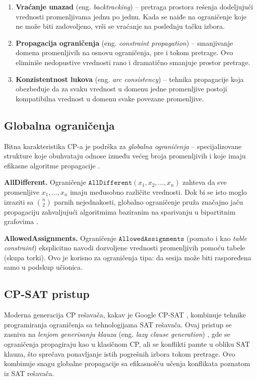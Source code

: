 \documentclass[12pt,oneside]{memoir}
\begin{document}
\begin{enumerate}
\item \textbf{Vraćanje unazad} (eng. \emph{backtracking}) --
  pretraga prostora rešenja dodeljujući vrednosti promenljivama
  jednu po jednu. Kada se naiđe na ograničenje koje ne može biti
  zadovoljeno, vrši se vraćanje na poslednju tačku izbora.

\item \textbf{Propagacija ograničenja} (eng. \emph{constraint propagation})
  -- smanjivanje domena promenljivih na osnovu ograničenja, pre i
  tokom pretrage. Ovo eliminiše nedopustive vrednosti rano i
  dramatično smanjuje prostor pretrage.

\item \textbf{Konzistentnost lukova} (eng. \emph{arc consistency}) --
  tehnika propagacije koja obezbeđuje da za svaku vrednost u domenu
  jedne promenljive postoji kompatibilna vrednost u domenu svake
  povezane promenljive.
\end{enumerate}

\subsection{Globalna ograničenja}

Bitna karakteristika CP-a je podrška za \emph{globalna ograničenja} --
specijalizovane strukture koje obuhvataju odnose između većeg broja
promenljivih i koje imaju efikasne algoritme propagacije \cite{regin1994}.

\textbf{AllDifferent.}
Ograničenje $\texttt{AllDifferent}(x_1, x_2, \ldots, x_n)$ zahteva
da sve promenljive $x_1, \ldots, x_n$ imaju međusobno različite
vrednosti. Dok bi se isto moglo izraziti sa $\binom{n}{2}$ parnih
nejednakosti, globalno ograničenje pruža značajno jaču propagaciju
zahvaljujući algoritmima baziranim na sparivanju u bipartitnim
grafovima \cite{regin1994}.

\textbf{AllowedAssignments.}
Ograničenje $\texttt{AllowedAssignments}$ (poznato i kao
\emph{table constraint}) eksplicitno navodi dozvoljene 
vrednosti promenljivih pomoću tabele (skupa torki). Ovo je korisno
za ograničenja tipa: da sesija može biti raspoređena samo u podskup učionica.

\subsection{CP-SAT pristup}

Moderna generacija CP rešavača, kakav je Google CP-SAT \cite{cpsat2020},
kombinuje tehnike programiranja ograničenja sa tehnologijama SAT
rešavača. Ovaj pristup se zasniva na \emph{lenjom generisanju klauza}
(eng. \emph{lazy clause generation}) \cite{ohrimenko2009}, gde se
ograničenja propagiraju kao u klasičnom CP, ali se konflikti pamte
u obliku SAT klauza, što sprečava ponavljanje istih pogrešnih izbora
tokom pretrage. Ovo kombinuje snagu globalne propagacije sa efikasnošću
učenja konflikata poznatom iz SAT rešavača.
\end{document}
